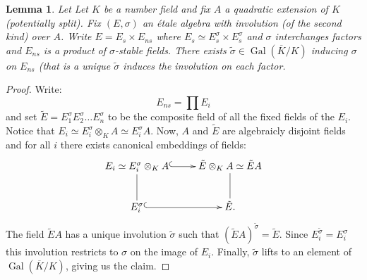\documentclass{article}
\theoremstyle{plain}
\newtheorem{lemma}[theorem]{Lemma}
\theoremstyle{definition}
\numberwithin{equation}{section}
\DeclareMathOperator{\Gal}{Gal}
\begin{document}
\begin{lemma}\label{Lem:liftsigma}
Let Let $K$ be a number field and fix $A$ a quadratic extension of $K$ (potentially split).
Fix $(E,\sigma)$ an \'etale algebra with involution (of the second kind) over $A$.
Write $E = E_s \times E_{ns}$ where $E_s \simeq E_s^\sigma \times E_s^\sigma$ and $\sigma$ interchanges factors and $E_{ns}$ is a product of $\sigma$-stable fields.
There exists $\tilde{\sigma} \in \Gal(\overline{K}/K)$ inducing $\sigma$ on $E_{ns}$ (that is a unique $\tilde{\sigma}$ induces the involution on each factor.
\end{lemma}
\begin{proof}
Write:
\[ E_{ns} = \prod E_i \]
and set $\tilde{E} = E_1^\sigma E_2^\sigma\ldots E_{n}^\sigma$ to be the composite field of all the fixed fields of the $E_i$.
Notice that $E_i \simeq E_i^\sigma\otimes_K A \simeq E_i^\sigma A$.
Now, $A$ and $\tilde{E}$ are algebraicly disjoint fields and for all $i$ there exists canonical embeddings of fields:
\[ \xymatrix{ E_i \simeq E_i^\sigma\otimes_K A \ar@{^(->}[r]\ar@{-}[d] &  \tilde{E} \otimes_K A \simeq \tilde{E}A \ar@{-}[d] \\ 
                      E_i^\sigma \ar@{^(->}[r]\ar@{-} & \tilde{E}.}
 \]
The field $\tilde{E}A$ has a unique involution $\tilde{\sigma}$ such that $(\tilde{E}A)^{\tilde{\sigma}} = \tilde{E}$. Since $E_i^{\tilde{\sigma}} = E_i^\sigma$ this involution restricts to $\sigma$ on the image of $E_i$.
Finally, $\tilde{\sigma}$ lifts to an element of $\Gal(\overline{K}/K)$, giving us the claim.
\end{proof}
\end{document}
